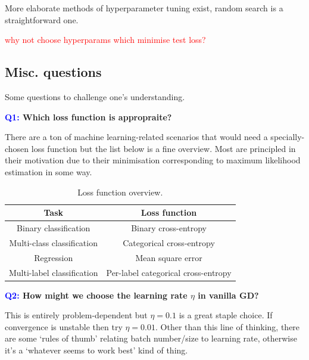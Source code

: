 \documentclass[11pt]{article}
\begin{document}
More elaborate methods of hyperparameter tuning exist, random search is a straightforward one.

\textcolor{red}{why not choose hyperparams which minimise test loss?}

\subsection{Misc. questions}

Some questions to challenge one's understanding.

\begin{center}
    \textbf{\textcolor{blue}{Q1:} Which loss function is appropraite?}
\end{center}
There are a ton of machine learning-related scenarios that would need a specially-chosen loss function but the list below is a fine overview. Most are principled in their motivation due to their minimisation corresponding to maximum likelihood estimation in some way.
\begin{table}[ht]
    \begin{center}
        \begin{tabular}{c||c}
            \textbf{Task} & \textbf{Loss function}\\
            \hline
            \hline
            Binary classification & Binary cross-entropy\\
            Multi-class classification & Categorical cross-entropy\\
            Regression & Mean square error\\
            Multi-label classification & Per-label categorical cross-entropy\\
            \hline
        \end{tabular}
    \end{center}
    \vspace{-15pt}
    \caption{Loss function overview.}
    \label{tab:loss_func_choices}
\end{table}

\begin{center}
    \textbf{\textcolor{blue}{Q2:} How might we choose the learning rate $\eta$ in vanilla GD?}
\end{center}
This is entirely problem-dependent but $\eta=0.1$ is a great staple choice. If convergence is unstable then try $\eta=0.01$. Other than this line of thinking, there are some `rules of thumb' relating batch number/size to learning rate, otherwise it's a `whatever seems to work best' kind of thing.
\end{document}
